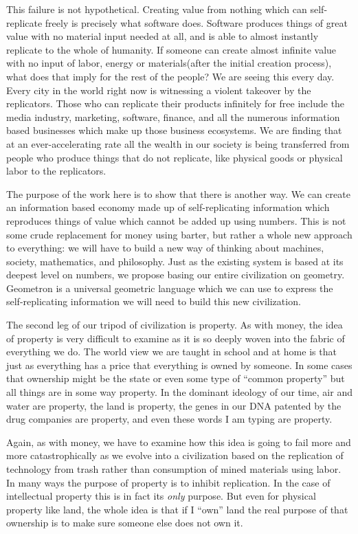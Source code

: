 This failure is not hypothetical.  Creating value from nothing which can self-replicate freely is precisely what software does.  Software produces things of great value with no material input needed at all, and is able to almost instantly replicate to the whole of humanity.  If someone can create almost infinite value with no input of labor, energy or materials(after the initial creation process), what does that imply for the rest of the people?  We are seeing this every day.  Every city in the world right now is witnessing a violent takeover by the replicators.  Those who can replicate their products infinitely for free include the media industry, marketing, software, finance, and all the numerous information based businesses which make up those business ecosystems.  We are finding that at an ever-accelerating rate all the wealth in our society is being transferred from people who produce things that do not replicate, like physical goods or physical labor to the replicators. 

The purpose of the work here is to show that there is another way.  We can create an information based economy made up of self-replicating information which reproduces things of value which cannot be added up using numbers.  This is not some crude replacement for money using barter, but rather a whole new approach to everything: we will have to build a new way of thinking about machines, society, mathematics, and philosophy.  Just as the existing system is based at its deepest level on numbers, we propose basing our entire civilization on geometry.  Geometron is a universal geometric language which we can use to express the self-replicating information we will need to build this new civilization.  

The second leg of our tripod of civilization is property.  As with money, the idea of property is very difficult to examine as it is so deeply woven into the fabric of everything we do.  The world view we are taught in school and at home is that just as everything has a price that everything is owned by someone.  In some cases that ownership might be the state or even some type of ``common property'' but all things are in some way property.   In the dominant ideology of our time, air and water are property, the land is property, the genes in our DNA patented by the drug companies are property, and even these words I am typing are property.  

Again, as with money, we have to examine how this idea is going to fail more and more catastrophically as we evolve into a civilization based on the replication of technology from trash rather than consumption of mined materials using labor.  In many ways the purpose of property is to inhibit replication.  In the case of intellectual property this is in fact its \emph{only} purpose. But even for physical property like land, the whole idea is that if I ``own'' land the real purpose of that ownership is to make sure someone else does not own it. 

